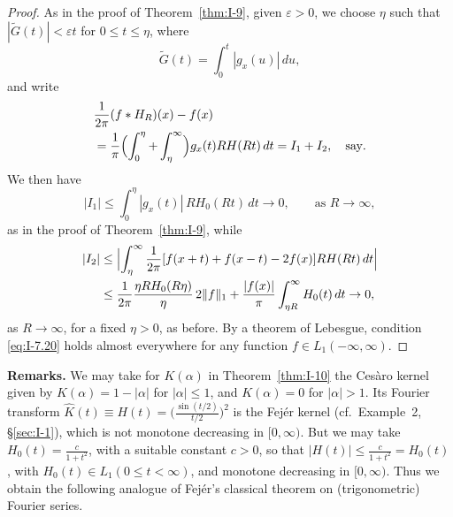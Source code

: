 \begin{proof}
As in the proof of Theorem~\ref{thm:I-9}, given $\varepsilon>0$, we choose $\eta$ such that $|\widetilde G(t)|<\varepsilon t$ for $0\le t\le\eta$, where
\begin{equation*}
\widetilde G(t)=\int_0^t|g_x(u)|\,du,
\end{equation*}
and write
\begin{equation*}
\begin{aligned}
&\frac{1}{2\pi}(f*H_R)(x) - f(x)\\
&= \frac{1}{\pi}  \Bigl(\int_0^\eta+\int_\eta^\infty\Bigr)g_x(t)RH(Rt)\,dt = I_1 + I_2,\quad\text{say}.
\end{aligned}
\end{equation*}
We then have
\begin{equation*}
|I_1|\le\int_0^\eta|g_x(t)|\,RH_0(Rt)\,dt\to 0,\qquad\text{as }R\to\infty,
\end{equation*}
as in the proof of Theorem~\ref{thm:I-9}, while
\begin{equation*}
\begin{aligned}
|I_2| &\le \Bigl|\int_\eta^\infty\frac{1}{2\pi}[f(x+t)+f(x-t)-2f(x)]RH(Rt)\,dt\Bigr|\\
&\le \frac{1}{2\pi}\frac{\eta RH_0(R\eta)}{\eta}\,2\|f\|_1
+\frac{|f(x)|}{\pi}\int_{\eta R}^\infty H_0(t)\,dt\to 0,
\end{aligned}
\end{equation*}
as $R\to\infty$, for a fixed $\eta>0$, as before. By a theorem of Lebesgue, condition \eqref{eq:I-7.20} holds almost everywhere for any function $f\in L_1(-\infty,\infty)$.
\end{proof}

\noindent\textbf{Remarks.}
We may take for $K(\alpha)$ in Theorem~\ref{thm:I-10} the Ces\`aro kernel given by $K(\alpha)=1-|\alpha|$ for $|\alpha|\le 1$, and $K(\alpha)=0$ for $|\alpha|>1$. Its Fourier transform $\hat K(t)\equiv H(t)=\bigl(\frac{\sin(t/2)}{t/2}\bigr)^2$ is the Fej\'er kernel (cf.\ Example~2, \S\ref{sec:I-1}), which is not monotone decreasing in $[0,\infty)$. But we may take $H_0(t)=\frac{c}{1+t^2}$, with a suitable constant $c>0$, so that $|H(t)|\le\frac{c}{1+t^2}=H_0(t)$, with $H_0(t)\in L_1(0\le t<\infty)$, and monotone decreasing in $[0,\infty)$. Thus we obtain the following analogue of Fej\'er's classical theorem on (trigonometric) Fourier series.

